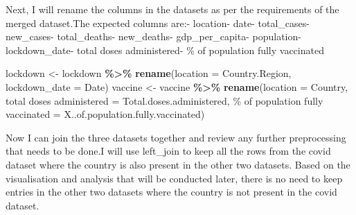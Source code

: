 \documentclass[
]{article}
\newenvironment{Shaded}{\begin{snugshade}}{\end{snugshade}}
\newcommand{\AttributeTok}[1]{\textcolor[rgb]{0.13,0.29,0.53}{#1}}
\newcommand{\FunctionTok}[1]{\textcolor[rgb]{0.13,0.29,0.53}{\textbf{#1}}}
\newcommand{\NormalTok}[1]{#1}
\newcommand{\OtherTok}[1]{\textcolor[rgb]{0.56,0.35,0.01}{#1}}
\newcommand{\SpecialCharTok}[1]{\textcolor[rgb]{0.81,0.36,0.00}{\textbf{#1}}}
\newcommand{\StringTok}[1]{\textcolor[rgb]{0.31,0.60,0.02}{#1}}
\begin{document}
Next, I will rename the columns in the datasets as per the requirements
of the merged dataset.\newline The expected columns are:\newline -
location\newline - date\newline - total\_cases\newline -
new\_cases\newline - total\_deaths\newline - new\_deaths\newline -
gdp\_per\_capita\newline - population\newline - lockdown\_date\newline -
total doses administered\newline - \% of population fully
vaccinated\newline

\begin{Shaded}
\begin{Highlighting}[]
\NormalTok{lockdown }\OtherTok{\textless{}{-}}\NormalTok{ lockdown }\SpecialCharTok{\%\textgreater{}\%}
  \FunctionTok{rename}\NormalTok{(}\AttributeTok{location =}\NormalTok{ Country.Region,}
         \AttributeTok{lockdown\_date =}\NormalTok{ Date)}
\NormalTok{vaccine }\OtherTok{\textless{}{-}}\NormalTok{ vaccine }\SpecialCharTok{\%\textgreater{}\%}  
  \FunctionTok{rename}\NormalTok{(}\AttributeTok{location =}\NormalTok{ Country,}
         \StringTok{\textasciigrave{}}\AttributeTok{total doses administered}\StringTok{\textasciigrave{}} \OtherTok{=} \StringTok{\textasciigrave{}}\AttributeTok{Total.doses.administered}\StringTok{\textasciigrave{}}\NormalTok{,}
         \StringTok{\textasciigrave{}}\AttributeTok{\% of population fully vaccinated}\StringTok{\textasciigrave{}} \OtherTok{=} \StringTok{\textasciigrave{}}\AttributeTok{X..of.population.fully.vaccinated}\StringTok{\textasciigrave{}}\NormalTok{)}
\end{Highlighting}
\end{Shaded}

\vspace{1cm}

Now I can join the three datasets together and review any further
preprocessing that needs to be done.\newline I will use left\_join to
keep all the rows from the covid dataset where the country is also
present in the other two datasets. Based on the visualisation and
analysis that will be conducted later, there is no need to keep entries
in the other two datasets where the country is not present in the covid
dataset.
\end{document}
